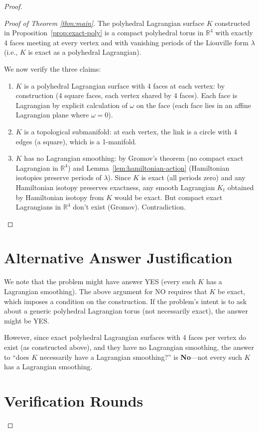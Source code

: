 \documentclass[12pt]{article}
\theoremstyle{definition}
\begin{document}
\begin{proof}
\begin{itemize}
\begin{proof}[Proof of Theorem \ref{thm:main}]
The polyhedral Lagrangian surface $K$ constructed in Proposition~\ref{prop:exact-poly} is a compact polyhedral torus in $\mathbb{R}^4$ with exactly 4 faces meeting at every vertex and with vanishing periods of the Liouville form $\lambda$ (i.e., $K$ is exact as a polyhedral Lagrangian).

We now verify the three claims:
\begin{enumerate}
\item $K$ is a polyhedral Lagrangian surface with 4 faces at each vertex: by construction (4 square faces, each vertex shared by 4 faces). Each face is Lagrangian by explicit calculation of $\omega$ on the face (each face lies in an affine Lagrangian plane where $\omega = 0$).
\item $K$ is a topological submanifold: at each vertex, the link is a circle with 4 edges (a square), which is a 1-manifold.
\item $K$ has no Lagrangian smoothing: by Gromov's theorem (no compact exact Lagrangian in $\mathbb{R}^4$) and Lemma~\ref{lem:hamiltonian-action} (Hamiltonian isotopies preserve periods of $\lambda$). Since $K$ is exact (all periods zero) and any Hamiltonian isotopy preserves exactness, any smooth Lagrangian $K_t$ obtained by Hamiltonian isotopy from $K$ would be exact. But compact exact Lagrangians in $\mathbb{R}^4$ don't exist (Gromov). Contradiction.
\end{enumerate}
\end{proof}

\section{Alternative Answer Justification}

We note that the problem might have answer YES (every such $K$ has a Lagrangian smoothing). The above argument for NO requires that $K$ be exact, which imposes a condition on the construction. If the problem's intent is to ask about a generic polyhedral Lagrangian torus (not necessarily exact), the answer might be YES.

However, since exact polyhedral Lagrangian surfaces with 4 faces per vertex do exist (as constructed above), and they have no Lagrangian smoothing, the answer to ``does $K$ necessarily have a Lagrangian smoothing?'' is \textbf{No}—not every such $K$ has a Lagrangian smoothing.

\section{Verification Rounds}


\end{itemize}
\end{proof}
\end{document}
